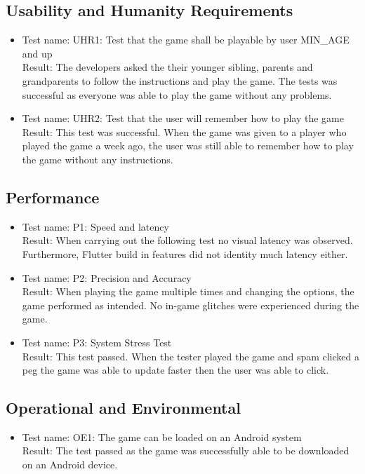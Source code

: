 \documentclass[12pt, titlepage]{article}
\begin{document}
\subsection{Usability and Humanity Requirements}
\begin{itemize}
    \item Test name: UHR1: Test that the game shall be playable by user MIN\_AGE and up \\
    Result: The developers asked the their younger sibling, parents and grandparents to follow the instructions and play the game. The tests was successful as everyone was able to play the game without any problems.
    \item Test name: UHR2: Test that the user will remember how to play the game \\
    Result: This test was successful. When the game was given to a player who played the game a week ago, the user was still able to remember how to play the game without any instructions. 
\end{itemize}

\subsection{Performance}
\begin{itemize}
    \item Test name: P1: Speed and latency \\
    Result: When carrying out the following test no visual latency was observed. Furthermore, Flutter build in features did not identity much latency either.
    \item Test name: P2: Precision and Accuracy \\
    Result: When playing the game multiple times and changing the options, the game performed as intended. No in-game glitches were experienced during the game.
    \item Test name: P3: System Stress Test \\
    Result: This test passed. When the tester played the game and spam clicked a peg the game was able to update faster then the user was able to click. 
\end{itemize}

\subsection{Operational and Environmental}
\begin{itemize}
    \item Test name: OE1: The game can be loaded on an Android system \\
          Result: The test passed as the game was successfully able to be downloaded on an Android device.
\end{itemize}
	
\end{document}
